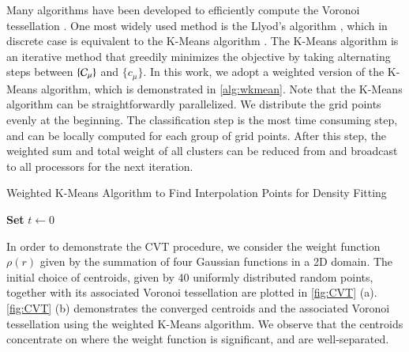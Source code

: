 Many algorithms have been developed to efficiently compute the Voronoi
tessellation \cite{medvedev1986algorithm}. One most widely used method is the
Llyod's algorithm \cite{lloyd1982least}, which in discrete case is equivalent to
the K\hyp{}Means algorithm \cite{MacQueen1967}. The K\hyp{}Means algorithm is an
iterative method that greedily minimizes the objective by taking alternating
steps between $\{\mathcal{C}_\mu\}$ and $\{c_\mu\}$. In this work, we adopt a weighted
version of the K\hyp{}Means algorithm, which is demonstrated in 
\cref{alg:wkmean}. Note that the K\hyp{}Means algorithm can be straightforwardly
parallelized. We distribute the grid points evenly at the beginning. The
classification step is the most time consuming step, and can be locally computed
for each group of grid points. After this step, the weighted sum and total
weight of all clusters can be reduced from and broadcast to all processors for
the next iteration.


\begin{algorithm}
  \caption{Weighted K\hyp{}Means Algorithm to Find Interpolation Points for
  Density Fitting}\label{alg:wkmean}
  \DontPrintSemicolon
  \textbf{Set} $t\gets 0$\;

\end{algorithm}

In order to demonstrate the CVT procedure, we consider the weight function $\rho
(r)$ given by the summation of four Gaussian functions in a 2D domain. The
initial choice of centroids, given by 40 uniformly distributed random points,
together with its associated Voronoi tessellation are plotted in \cref{fig:CVT} 
(a). \cref{fig:CVT} (b) demonstrates the converged centroids
and the associated Voronoi tessellation using the weighted K\hyp{}Means
algorithm. We observe that the centroids concentrate on where the weight
function is significant, and are well\hyp{}separated.

